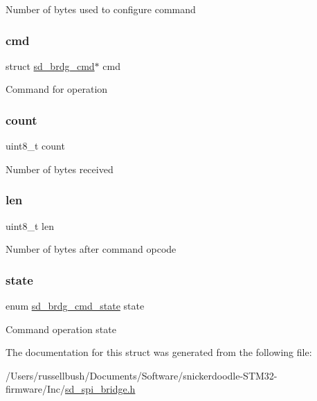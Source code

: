 Number of bytes used to configure command \mbox{\label{structsd__brdg__op_a61d7114c96c2ffeb66ccd43c213f627a}} 
\subsubsection{\texorpdfstring{cmd}{cmd}}
{\footnotesize\ttfamily struct \mbox{\hyperlink{structsd__brdg__cmd}{sd\+\_\+brdg\+\_\+cmd}}$\ast$ cmd}

Command for operation \mbox{\label{structsd__brdg__op_a20302e2c99a60d3f612dba57e3f6333b}} 
\subsubsection{\texorpdfstring{count}{count}}
{\footnotesize\ttfamily uint8\+\_\+t count}

Number of bytes received \mbox{\label{structsd__brdg__op_a5723e60ffd628510c699eddbce90be23}} 
\subsubsection{\texorpdfstring{len}{len}}
{\footnotesize\ttfamily uint8\+\_\+t len}

Number of bytes after command opcode \mbox{\label{structsd__brdg__op_adde4bff8a8812e447e9b0a554f08c8e9}} 
\subsubsection{\texorpdfstring{state}{state}}
{\footnotesize\ttfamily enum \mbox{\hyperlink{group___s_d___b_r_d_g___types_gaa60a189c7c824797307ab14f0c594610}{sd\+\_\+brdg\+\_\+cmd\+\_\+state}} state}

Command operation state 

The documentation for this struct was generated from the following file\+:\begin{DoxyCompactItemize}
\item 
/\+Users/russellbush/\+Documents/\+Software/snickerdoodle-\/\+S\+T\+M32-\/firmware/\+Inc/\mbox{\hyperlink{sd__spi__bridge_8h}{sd\+\_\+spi\+\_\+bridge.\+h}}\end{DoxyCompactItemize}
